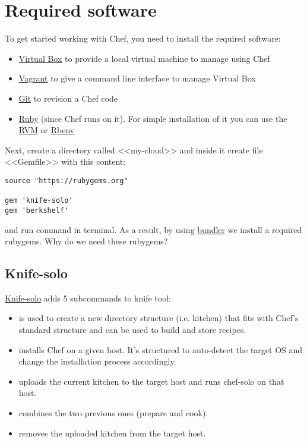 \section{Required software}

To get started working with Chef, you need to install the required software:

\begin{itemize}
  \item \href{https://www.virtualbox.org/}{Virtual Box} to provide a local virtual machine to manage using Chef
  \item \href{http://www.vagrantup.com/}{Vagrant} to give a command line interface to manage Virtual Box
  \item \href{http://git-scm.com/}{Git} to revision a Chef code
  \item \href{https://www.ruby-lang.org}{Ruby} (since Chef runs on it). For simple installation of it you can use the \href{https://rvm.io/}{RVM} or \href{https://github.com/sstephenson/rbenv}{Rbenv}
\end{itemize}

Next, create a directory called <<my-cloud>> and inside it create file <<Gemfile>> with this content:

\begin{lstlisting}[label=lst:my-cloud-required1,title=my-cloud/Gemfile]
source "https://rubygems.org"

gem 'knife-solo'
gem 'berkshelf'
\end{lstlisting}

and run command  in terminal. As a result, by using \href{http://bundler.io/}{bundler} we install a required rubygems. Why do we need these rubygems?

\subsection{Knife-solo}

\href{http://matschaffer.github.io/knife-solo/}{Knife-solo} adds 5 subcommands to knife tool:

\begin{itemize}
  \item {} is used to create a new directory structure (i.e. kitchen) that fits with Chef's standard structure and can be used to build and store recipes.
  \item {} installs Chef on a given host. It's structured to auto-detect the target OS and change the installation process accordingly.
  \item {} uploads the current kitchen to the target host and runs chef-solo on that host.
  \item {} combines the two previous ones (prepare and cook).
  \item {} removes the uploaded kitchen from the target host.
\end{itemize}

